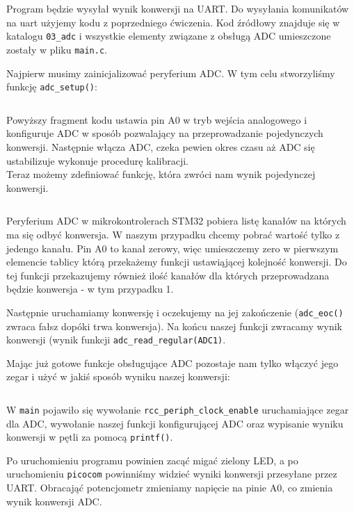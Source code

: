 \documentclass{pdfBooklets}
\begin{document}
Program będzie wysyłał wynik konwersji na UART. Do wysyłania komunikatów na uart użyjemy kodu z poprzedniego ćwiczenia.
Kod źródłowy znajduje się w katalogu \Verb$03_adc$ i wszystkie elementy związane z obsługą ADC umieszczone zostały w pliku \Verb$main.c$.

Najpierw musimy zainicjalizować peryferium ADC. W tym celu stworzyliśmy funkcję \Verb$adc_setup()$:

\inputminted[frame=single,firstline=13,lastline=35]{c}{stm32-examples/03_adc/main.c} %

Powyższy fragment kodu ustawia pin A0 w tryb wejścia analogowego i konfiguruje ADC w sposób pozwalający na przeprowadzanie pojedynczych konwersji. Następnie włącza ADC, czeka pewien okres czasu aż ADC się ustabilizuje wykonuje procedurę kalibracji.\\

Teraz możemy zdefiniować funkcję, która zwróci nam wynik pojedynczej konwersji.

\inputminted[frame=single,firstline=36,lastline=48]{c}{stm32-examples/03_adc/main.c} %

Peryferium ADC w mikrokontrolerach STM32 pobiera listę kanałów na których ma się odbyć konwersja. W naszym przypadku chcemy pobrać
wartość tylko z jedengo kanału. Pin A0 to kanał zerowy, więc umieszczemy zero w pierwszym elemencie tablicy którą przekażemy
funkcji ustawiąjącej kolejność konwersji. Do tej funkcji przekazujemy również ilość kanałów dla których przeprowadzana będzie
konwersja - w tym przypadku 1.

Następnie uruchamiamy konwersję i oczekujemy na jej zakończenie (\Verb$adc_eoc()$ zwraca fałsz dopóki trwa konwersja).
Na końcu naszej funkcji zwracamy wynik konwersji (wynik funkcji \Verb$adc_read_regular(ADC1)$.

Mając już gotowe funkcje obsługujące ADC pozostaje nam tylko włączyć jego zegar i użyć w jakiś sposób wyniku naszej konwersji:

\inputminted[frame=single,firstline=49]{c}{stm32-examples/03_adc/main.c} %

W \Verb$main$ pojawiło się wywołanie \Verb$rcc_periph_clock_enable$ uruchamiające zegar dla ADC, wywołanie naszej funkcji
konfigurującej ADC oraz wypisanie wyniku konwersji w pętli za pomocą \Verb$printf()$.

Po uruchomieniu programu powinien zacąć migać zielony LED, a po uruchomieniu \Verb$picocom$ powinniśmy widzieć wyniki konwersji
przesyłane przez UART. Obracająć potencjometr zmieniamy napięcie na pinie A0, co zmienia wynik konwersji ADC.
\end{document}

